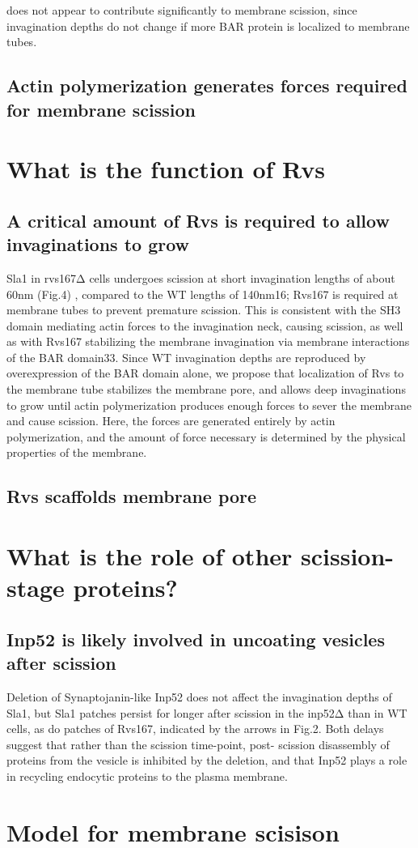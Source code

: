 does not appear to contribute significantly to membrane scission, since invagination depths do not change if more BAR protein is localized to membrane tubes. 

\subsection{ Actin polymerization generates forces required for membrane scission}

\section{What is the function of Rvs}





\subsection{A critical amount of Rvs is required to allow invaginations to grow}

Sla1 in rvs167Δ cells undergoes scission at short invagination lengths of about 60nm (Fig.4) , compared to the WT lengths of 140nm16; Rvs167 is required at membrane tubes to prevent premature scission. This is consistent with the SH3 domain mediating actin forces to the invagination neck, causing scission, as well as with Rvs167 stabilizing the membrane invagination via membrane interactions of the BAR domain33. Since WT invagination depths are reproduced by overexpression of the BAR domain alone, we propose that localization of Rvs to the membrane tube stabilizes the membrane pore, and allows deep invaginations to grow until actin polymerization produces enough forces to sever the membrane and cause scission. Here, the forces are generated entirely by actin polymerization, and the amount of force necessary is determined by the physical properties of the membrane.

\subsection{Rvs scaffolds membrane pore}



\section{What is the role of other scission-stage proteins?}
\subsection{Inp52 is likely involved in uncoating vesicles after scission}
Deletion of Synaptojanin-like Inp52 does not affect the invagination depths of Sla1, but Sla1 patches persist for longer after scission in the inp52Δ than in WT cells, as do patches of Rvs167, indicated by the arrows in Fig.2. Both delays suggest that rather than the scission time-point, post- scission disassembly of proteins from the vesicle is inhibited by the deletion, and that Inp52 plays a role in recycling endocytic proteins to the plasma membrane.


\section{Model for membrane scisison}



